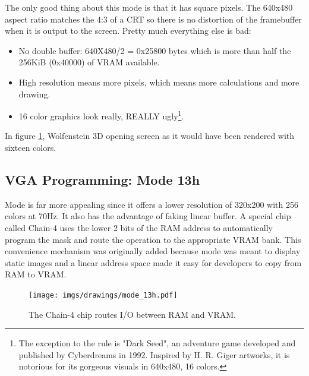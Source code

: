 \documentclass[book.tex]{subfiles}
\begin{document}
The only good thing about this mode is that it has square pixels. The 640x480 aspect ratio matches the 4:3 of a CRT so there is no distortion of the framebuffer when it is output to the screen. Pretty much everything else is bad:\\
\begin{itemize}
\item No double buffer: 640X480/2 = 0x25800 bytes which is more than half the 256KiB (0x40000) of VRAM available.
\item High resolution means more pixels, which means more calculations and more drawing.
\item 16 color graphics look really, REALLY ugly\footnote{The exception to the rule is "Dark Seed", an adventure game developed and published by Cyberdreams in 1992. Inspired by H. R. Giger artworks, it is notorious for its gorgeous visuals in 640x480, 16 colors.}.
\end{itemize}

 \begin{figure}[H]
\centering
 \caption{}
 \label{wolf16}
\end{figure}
\par
In figure \ref{wolf16}, Wolfenstein 3D opening screen as it would have been rendered with sixteen colors.




 \pagebreak
  \subsection{VGA Programming: Mode 13h}
  Mode  is far more appealing since it offers a lower resolution of 320x200 with 256 colors at 70Hz. It also has the advantage of faking linear buffer. A special chip called Chain-4 uses the lower 2 bits of the RAM address to automatically program the mask and route the operation to the appropriate VRAM bank. This convenience mechanism was originally added because mode  was meant to display static images and a linear address space made it easy for developers to copy from RAM to VRAM.\\
  \par
 \begin{figure}[H]
\centering
      \texttt{[image: imgs/drawings/mode\_13h.pdf]}
      \caption{The Chain-4 chip routes I/O between RAM and VRAM.}
\end{figure}
\par
\end{document}
